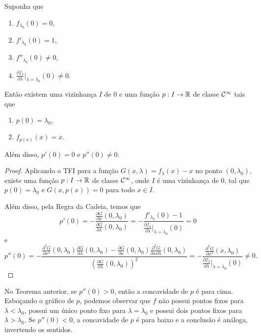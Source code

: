 \begin{theorem}
Suponha que
\begin{enumerate}
\item $f_{\lambda_0}(0) = 0$,
\item $f'_{\lambda_0}(0) = 1$,
\item $f''_{\lambda_0}(0) \neq 0$,
\item $\frac{\partial f_\lambda}{\partial \lambda} |_{\lambda = \lambda_0}(0) \neq 0$.
\end{enumerate}
Então existem uma vizinhança $I$ de $0$ e uma função $p: I \to \mathbb{R}$ de classe $\mathcal{C}^\infty$ tais que
\begin{enumerate}
\item $p(0) = \lambda_0$,
\item $f_{p(x)}(x) = x$.
\end{enumerate}
Além disso, $p'(0) = 0$ e $p''(0) \neq 0$.
\end{theorem}

\begin{proof}
Aplicando o TFI para a função $G(x, \lambda) = f_\lambda(x) - x$ no ponto $(0, \lambda_0)$, existe uma função $p: I \to \mathbb{R}$ de classe $\mathcal{C}^\infty$, onde $I$ é uma vizinhança de $0$, tal que $p(0) = \lambda_0$ e $G(x, p(x)) = 0$ para todo $x \in I$.

Além disso, pela Regra da Cadeia, temos que
$$p'(0) = - \frac{\frac{\partial G}{\partial x}(0, \lambda_0)}
{\frac{\partial G}{\partial \lambda}(0, \lambda_0)} = - \frac{f'_{\lambda_0}(0) - 1}{\frac{\partial f_\lambda}{\partial \lambda}|_{\lambda = \lambda_0}(0)} = 0$$
e
$$ p''(0) = - \frac{\frac{\partial^2 G}{\partial x^2}(0, \lambda_0)\frac{\partial G}{\partial \lambda}(0, \lambda_0) - \frac{\partial G}{\partial x}(0, \lambda_0) \frac{\partial^2 G}{ \partial x \partial \lambda}(0, \lambda_0)}
{\left( \frac{\partial G}{\partial \lambda}(0, \lambda_0) \right)^2}  = - \frac{\frac{\partial^2 G}{\partial x^2}(x, \lambda_0)}{ \frac{\partial f_\lambda}{\partial \lambda}|_{\lambda = \lambda_0}(0)} \neq 0.$$
\end{proof}

No Teorema anterior, se $p''(0) > 0$, então a concavidade de $p$ é para cima. Esboçando o gráfico de $p$, podemos observar que $f$ não possui pontos fixos para $\lambda < \lambda_0$, possui um único ponto fixo para $\lambda = \lambda_0$ e possui dois pontos fixos para $\lambda > \lambda_0$. Se $p''(0) < 0$, a concavidade de $p$ é para baixo e a conclusão é análoga, invertendo os sentidos.

